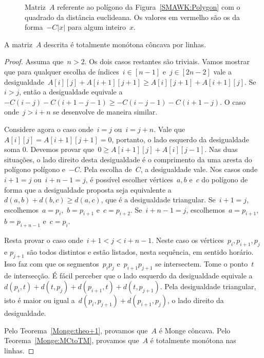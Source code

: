 \begin{figure}[h]
    \centering
    
    \caption{Matriz~$A$ referente ao polígono da Figura~\ref{SMAWK:Polygon} com o quadrado da distância euclideana. Os valores em vermelho são os da forma~$-C|x|$ para algum inteiro~$x$.}
\end{figure}

\begin{prop}
A matriz~$A$ descrita é totalmente monótona côncava por linhas.
\end{prop}

\begin{proof}
Assuma que~$n > 2$. Os dois casos restantes são triviais. Vamos mostrar que para qualquer escolha de índices~${ i \in [n-1] }$ e~${ j \in [2n-2] }$ vale a desigualdade~${ A[i][j] + A[i+1][j+1] \geq A[i][j+1] + A[i+1][j] }$. Se~$i > j$, então a desigualdade equivale a~${ -C(i - j) - C(i + 1 - j - 1) \geq -C(i - j - 1) - C(i + 1 - j) }$. O caso onde~${ j > i + n} $ se desenvolve de maneira similar.

Considere agora o caso onde~$i = j$ ou~$i = j + n$. Vale que~$A[i][j] = A[i+1][j+1] = 0$, portanto, o lado esquerdo da desigualdade soma 0. Devemos provar que~$0 \geq A[i+1][j] + A[i][j-1]$. Nas duas situações, o lado direito desta desigualdade é o comprimento da uma aresta do polígono polígono e~$-C$. Pela escolha de~$C$, a desigualdade vale. Nos casos onde~$i + 1 = j$ ou~$i + n - 1 = j$, é possível escolher vértices~$a,b$ e~$c$ do polígono de forma que a desigualdade proposta seja equivalente a~$d(a,b) + d(b,c) \geq d(a,c)$, que é a desigualdade triangular. Se~$i+1 = j$, escolhemos~$a = p_i$,~$b = p_{i+1}$ e~$c = p_{i+2}$. Se~$i+n-1 = j$, escolhemos~$a = p_{i+1}$,~$b = p_{i+n-1}$ e~$c = p_{i}$.

Resta provar o caso onde~$i + 1 < j < i + n - 1$. Neste caso os vértices~$p_i,p_{i+1},p_j$ e $p_{j+1}$ são todos distintos e estão listados, nesta sequência, em sentido horário. Isso faz com que os segmentos~$p_ip_j$ e~$p_{i+1}p_{j+1}$ se intersectem. Tome o ponto~$t$ de intersecção. É fácil perceber que o lado esquerdo da desigualdade equivale a~$d(p_i,t) + d(t,p_j) + d(p_{i+1},t) + d(t,p_{j+1})$. Pela desigualdade triangular, isto é maior ou igual a~$d(p_i,p_{j+1}) + d(p_{i+1},p_j)$, o lado direito da desigualdade.

Pelo Teorema~\ref{Monge:theo+1}, provamos que~$A$ é Monge côncava. Pelo Teorema~\ref{Monge:MCtoTM}, provamos que~$A$ é totalmente monótona nas linhas.
\end{proof}

